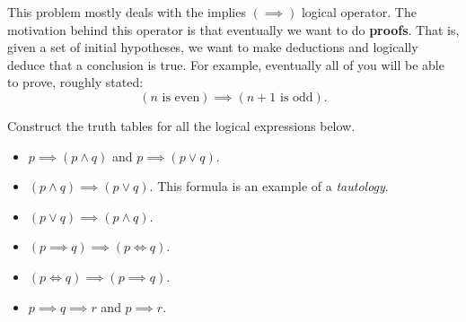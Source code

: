 This problem mostly deals with the implies $(\implies)$ logical operator. The motivation behind this operator is that eventually we want to do \textbf{proofs}. That is, given a set of initial hypotheses, we want to make deductions and logically deduce that a conclusion is true. For example, eventually all of you will be able to prove, roughly stated:
\[(\text{$n$ is even}) \implies (\text{$n + 1$ is odd}).\]

Construct the truth tables for all the logical expressions below.
\begin{itemize}
    \item $p \implies (p \land q)$ and $p \implies (p \lor q)$.
    \item $(p \land q) \implies (p \lor q)$. This formula is an example of a \textit{tautology}.
    \item $(p \lor q) \implies (p \land q)$.
    \item $(p \implies q) \implies (p \iff q)$.
    \item $(p \iff q) \implies (p \implies q)$.
    \item $p \implies q \implies r$ and $p \implies r$.
\end{itemize}
